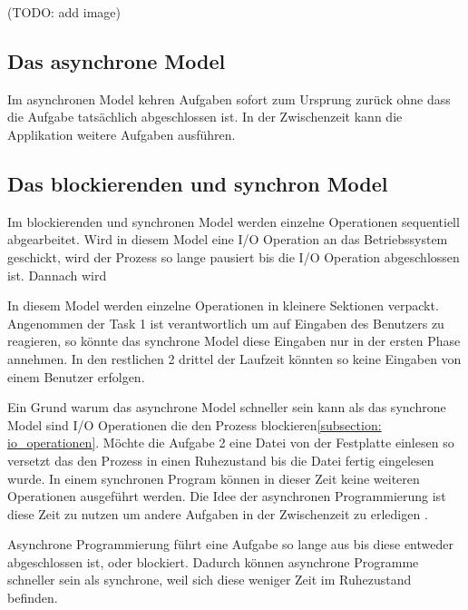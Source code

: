 (TODO: add image)

\subsection{Das asynchrone Model}

Im asynchronen Model kehren Aufgaben sofort zum Ursprung zurück ohne dass die Aufgabe tatsächlich abgeschlossen ist. In der Zwischenzeit kann die Applikation weitere Aufgaben ausführen. 


\subsection{Das blockierenden und synchron Model}
Im blockierenden und synchronen Model werden einzelne Operationen sequentiell abgearbeitet. Wird in diesem Model eine I/O Operation an das Betriebssystem geschickt, wird der Prozess so lange pausiert bis die I/O Operation abgeschlossen ist. Dannach wird 





In diesem Model werden einzelne Operationen in kleinere Sektionen verpackt. Angenommen der Task 1 ist verantwortlich um auf Eingaben des Benutzers zu reagieren, so könnte das synchrone Model diese Eingaben nur in der ersten Phase annehmen. In den restlichen 2 drittel der Laufzeit könnten so keine Eingaben von einem Benutzer erfolgen.

Ein Grund warum das asynchrone Model schneller sein kann als das synchrone Model sind I/O Operationen die den Prozess blockieren\ref{subsection: io_operationen}. Möchte die Aufgabe 2 eine Datei von der Festplatte einlesen so versetzt das den Prozess in einen Ruhezustand bis die Datei fertig eingelesen wurde. In einem synchronen Program können in dieser Zeit keine weiteren Operationen ausgeführt werden. Die Idee der asynchronen Programmierung ist diese Zeit zu nutzen um andere Aufgaben in der Zwischenzeit zu erledigen \cite[]{Pet2015}. 

Asynchrone Programmierung führt eine Aufgabe so lange aus bis diese entweder abgeschlossen ist, oder blockiert. Dadurch können asynchrone Programme schneller sein als synchrone, weil sich diese weniger Zeit im Ruhezustand befinden.  

